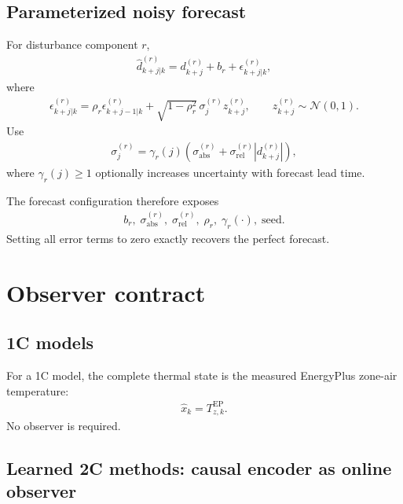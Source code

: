 \documentclass[11pt]{article}
\begin{document}
\subsection{Parameterized noisy forecast}

For disturbance component \(r\),
\begin{align}
\widehat d^{(r)}_{k+j|k}
=
d^{(r)}_{k+j}
+
b_r
+
\epsilon^{(r)}_{k+j|k},
\tag{6.43}
\end{align}
where
\begin{align}
\epsilon^{(r)}_{k+j|k}
=
\rho_r\epsilon^{(r)}_{k+j-1|k}
+
\sqrt{1-\rho_r^2}\,
\sigma^{(r)}_j
z^{(r)}_{k+j},
\qquad
z^{(r)}_{k+j}\sim\mathcal N(0,1).
\tag{6.44}
\end{align}
Use
\begin{align}
\sigma^{(r)}_j
=
\gamma_r(j)
\left(
\sigma^{(r)}_{\mathrm{abs}}
+
\sigma^{(r)}_{\mathrm{rel}}
|d^{(r)}_{k+j}|
\right),
\tag{6.45}
\end{align}
where \(\gamma_r(j)\ge1\) optionally increases uncertainty with forecast lead time.

The forecast configuration therefore exposes
\begin{align}
\boxed{
b_r,\;
\sigma^{(r)}_{\mathrm{abs}},\;
\sigma^{(r)}_{\mathrm{rel}},\;
\rho_r,\;
\gamma_r(\cdot),\;
\mathrm{seed}.
}
\tag{6.46}
\end{align}
Setting all error terms to zero exactly recovers the perfect forecast.

\section{Observer contract}

\subsection{1C models}

For a 1C model, the complete thermal state is the measured EnergyPlus zone-air temperature:
\begin{align}
\boxed{
\widehat x_k
=
T_{z,k}^{\mathrm{EP}}.
}
\tag{6.47}
\end{align}
No observer is required.

\subsection{Learned 2C methods: causal encoder as online observer}
\end{document}
